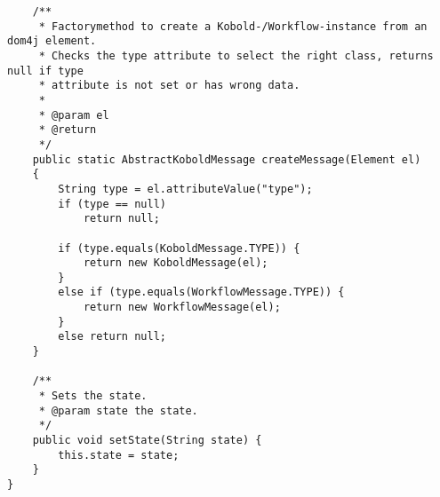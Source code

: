 \begin{verbatim}
	/**
	 * Factorymethod to create a Kobold-/Workflow-instance from an dom4j element.
	 * Checks the type attribute to select the right class, returns null if type
	 * attribute is not set or has wrong data.
	 * 
	 * @param el
	 * @return
	 */
	public static AbstractKoboldMessage createMessage(Element el)
	{
		String type = el.attributeValue("type");
		if (type == null)
			return null;
		
		if (type.equals(KoboldMessage.TYPE)) {
			return new KoboldMessage(el);
		}
		else if (type.equals(WorkflowMessage.TYPE)) {
			return new WorkflowMessage(el);
		}
		else return null;	
	}

	/**
	 * Sets the state.
	 * @param state the state.
	 */
	public void setState(String state) {
		this.state = state;
	}
}

\end{verbatim}

